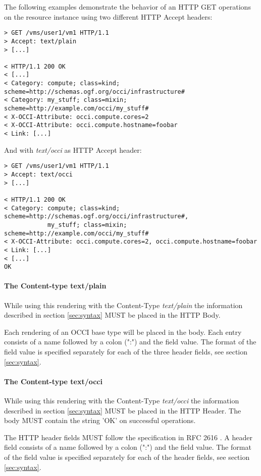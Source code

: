 \documentclass[10pt,a4paper]{article}
\begin{document}
The following examples demonstrate the behavior of an HTTP GET
operations on the resource instance \emph{} using two different HTTP
Accept headers:

\begin{verbatim}
> GET /vms/user1/vm1 HTTP/1.1
> Accept: text/plain
> [...]
 
< HTTP/1.1 200 OK
< [...]
< Category: compute; class=kind; scheme=http://schemas.ogf.org/occi/infrastructure#
< Category: my_stuff; class=mixin; scheme=http://example.com/occi/my_stuff#
< X-OCCI-Attribute: occi.compute.cores=2
< X-OCCI-Attribute: occi.compute.hostname=foobar
< Link: [...]
\end{verbatim}

And with \emph{text/occi} as HTTP Accept header:

\begin{verbatim}
> GET /vms/user1/vm1 HTTP/1.1
> Accept: text/occi
> [...]
 
< HTTP/1.1 200 OK
< Category: compute; class=kind; scheme=http://schemas.ogf.org/occi/infrastructure#,
            my_stuff; class=mixin; scheme=http://example.com/occi/my_stuff#
< X-OCCI-Attribute: occi.compute.cores=2, occi.compute.hostname=foobar
< Link: [...]
< [...]
OK
\end{verbatim}

\paragraph{The Content-type text/plain}
While using this rendering with the Content-Type \textit{text/plain}
the information described in section \ref{sec:syntax} MUST be placed
in the HTTP Body.

Each rendering of an OCCI base type will be placed in the body. Each
entry consists of a name followed by a colon (":") and the field
value. The format of the field value is specified separately for each
of the three header fields, see section \ref{sec:syntax}.

\paragraph{The Content-type text/occi}
While using this rendering with the Content-Type \textit{text/occi}
the information described in section \ref{sec:syntax} MUST be placed
in the HTTP Header. The body MUST contain the string 'OK' on
successful operations.

The HTTP header fields MUST follow the specification in RFC 2616
\cite{rfc2616}. A header field consists of a name followed by a colon
(":") and the field value. The format of the field value is specified
separately for each of the header fields, see section
\ref{sec:syntax}.
\end{document}
